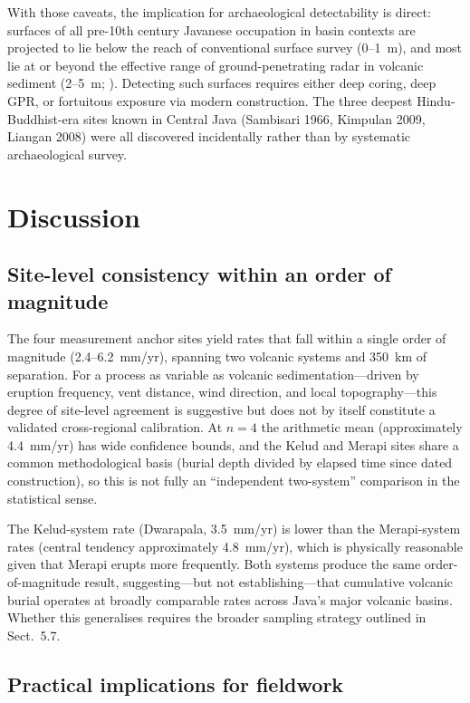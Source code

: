 \documentclass[12pt,a4paper]{article}
\begin{document}
With those caveats, the implication for archaeological detectability is direct: surfaces of all pre-10th century Javanese occupation in basin contexts are projected to lie below the reach of conventional surface survey (0--1~m), and most lie at or beyond the effective range of ground-penetrating radar in volcanic sediment (2--5~m; \citealp{conyers2004,goodman2013}). Detecting such surfaces requires either deep coring, deep GPR, or fortuitous exposure via modern construction. The three deepest Hindu-Buddhist-era sites known in Central Java (Sambisari 1966, Kimpulan 2009, Liangan 2008) were all discovered incidentally rather than by systematic archaeological survey.


\section{Discussion}

\subsection{Site-level consistency within an order of magnitude}

The four measurement anchor sites yield rates that fall within a single order of magnitude (2.4--6.2~mm/yr), spanning two volcanic systems and 350~km of separation. For a process as variable as volcanic sedimentation---driven by eruption frequency, vent distance, wind direction, and local topography---this degree of site-level agreement is suggestive but does not by itself constitute a validated cross-regional calibration. At $n=4$ the arithmetic mean (approximately 4.4~mm/yr) has wide confidence bounds, and the Kelud and Merapi sites share a common methodological basis (burial depth divided by elapsed time since dated construction), so this is not fully an ``independent two-system'' comparison in the statistical sense.

The Kelud-system rate (Dwarapala, 3.5~mm/yr) is lower than the Merapi-system rates (central tendency approximately 4.8~mm/yr), which is physically reasonable given that Merapi erupts more frequently. Both systems produce the same order-of-magnitude result, suggesting---but not establishing---that cumulative volcanic burial operates at broadly comparable rates across Java's major volcanic basins. Whether this generalises requires the broader sampling strategy outlined in Sect.~5.7.

\subsection{Practical implications for fieldwork}
\end{document}
